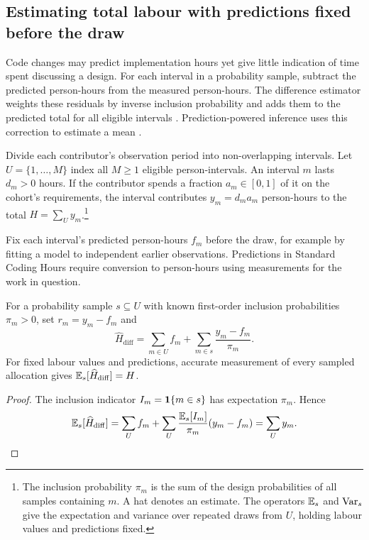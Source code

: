 \subsection{Estimating total labour with predictions fixed before the draw}
\label{sec:model-assisted}

Code changes may predict implementation hours yet give little indication of time spent discussing a design. For each interval in a probability sample, subtract the predicted person-hours from the measured person-hours. The difference estimator weights these residuals by inverse inclusion probability and adds them to the predicted total for all eligible intervals \cite[Section~2.3]{denishaddou2026}. Prediction-powered inference uses this correction to estimate a mean \cite[Section~1.4 and Appendix~B of the accompanying preprint]{angelopoulos2023}.

Divide each contributor's observation period into non-overlapping intervals. Let $U=\{1,\ldots,M\}$ index all $M\geq1$ eligible person-intervals. An interval $m$ lasts $d_m>0$ hours. If the contributor spends a fraction $a_m\in[0,1]$ of it on the cohort's requirements, the interval contributes $y_m=d_ma_m$ person-hours to the total $H=\sum_U y_m$.\footnote{The inclusion probability $\pi_m$ is the sum of the design probabilities of all samples containing $m$. A hat denotes an estimate. The operators $\mathbb E_s$ and $\operatorname{Var}_s$ give the expectation and variance over repeated draws from $U$, holding labour values and predictions fixed.}

Fix each interval's predicted person-hours $f_m$ before the draw, for example by fitting a model to independent earlier observations. Predictions in Standard Coding Hours require conversion to person-hours using measurements for the work in question.

\begin{proposition}
\label{prop:difference-estimator}
For a probability sample $s\subseteq U$ with known first-order inclusion probabilities $\pi_m>0$, set $r_m=y_m-f_m$ and
\begin{equation}
 \widehat H_{\mathrm{diff}}
 =\sum_{m\in U}f_m+\sum_{m\in s}\frac{y_m-f_m}{\pi_m}.
 \label{eq:difference-estimator}
\end{equation}
For fixed labour values and predictions, accurate measurement of every sampled allocation gives $\mathbb E_s[\widehat H_{\mathrm{diff}}]=H$.
\end{proposition}

\begin{proof}
The inclusion indicator $I_m=\mathbf 1\{m\in s\}$ has expectation $\pi_m$. Hence
\[
 \mathbb E_s[\widehat H_{\mathrm{diff}}]
 =\sum_Uf_m+\sum_U\frac{\mathbb E_s[I_m]}{\pi_m}(y_m-f_m)
 =\sum_Uy_m.
\]
\end{proof}

